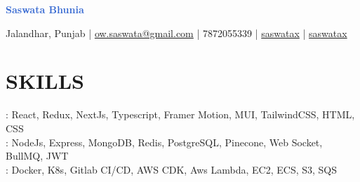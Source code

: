 \documentclass[]{resume}
\begin{document}
\textrm{\Huge\textcolor{highlight}{\textbf{Saswata Bhunia}}}
\vspace{.4em}

Jalandhar, Punjab | \href{mailto:ow.saswata@gmail.com}{ow.saswata@gmail.com} | 7872055339 | \href{https://www.linkedin.com/in/saswatax}{\faLinkedin \space saswatax} | \href{https://github.com/saswatax}{\faGithub \space saswatax}
\vspace{.6em}


\section{SKILLS}
: React, Redux, NextJs, Typescript, Framer Motion, MUI, TailwindCSS, HTML, CSS \\
: NodeJs, Express, MongoDB, Redis, PostgreSQL, Pinecone, Web Socket, BullMQ, JWT \\
: Docker, K8s, Gitlab CI/CD, AWS CDK, Aws Lambda, EC2, ECS, S3, SQS
\end{document}

